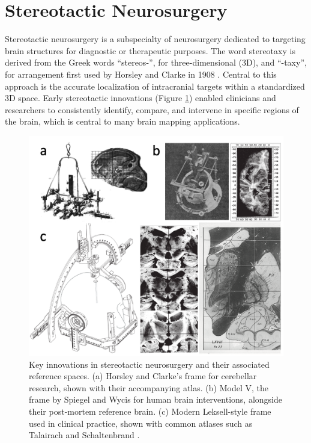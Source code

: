 \section{Stereotactic Neurosurgery}
\label{sec:SNSX}
Stereotactic neurosurgery is a subspecialty of neurosurgery dedicated to targeting brain structures for diagnostic or therapeutic purposes. The word stereotaxy is derived from the Greek words “stereos-”, for three-dimensional (3D), and “-taxy”, for arrangement first used by Horsley and Clarke in 1908 \cite{Horsley1908-om}. Central to this approach is the accurate localization of intracranial targets within a standardized 3D space. Early stereotactic innovations (Figure \ref{fig:ch1_Figure_stereoframe}) enabled clinicians and researchers to consistently identify, compare, and intervene in specific regions of the brain, which is central to many brain mapping applications.

\begin{figure}[hbt!]
    \centering
    \includegraphics[width=0.85\linewidth]{figs/ch1_Figure_stereoframe.png}
    \caption{Key innovations in stereotactic neurosurgery and their associated reference spaces. (a) Horsley and Clarke’s \cite {Horsley1908-om} frame for cerebellar research, shown with their accompanying atlas. (b) Model V, the frame by Spiegel and Wycis \cite{Spiegel1947-rq} for human brain interventions, alongside their post-mortem reference brain. (c) Modern Leksell-style frame used in clinical practice, shown with common atlases such as Talairach \cite{Talairach1957-eb} and Schaltenbrand \cite{Schaltenbrand1977-ge}.}
    \label{fig:ch1_Figure_stereoframe}
\end{figure}

